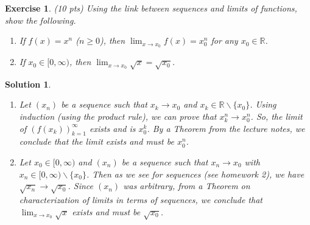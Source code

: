 \documentclass[12pt]{article}
\newcommand{\bR}{\mathbb{R}}
\newcommand{\ra}{\rightarrow}
\theoremstyle{plain}
\newtheorem{exer}{\textbf{Exercise}}}
\theoremstyle{plain}
\newtheorem*{sol}{\textbf{Solution}}}
\theoremstyle{plain}
\theoremstyle{plain}
\begin{document}
\begin{exer}
(10 pts)
Using the link between sequences and limits of functions, show the following.
	\begin{enumerate}[label=\textbf{\alph*)}]
	\item If $f(x) = x^n$ ($n \geq 0$), then $\lim_{x \ra x_0} f(x) = x_0^n$ for any $x_0 \in \bR$.
	\item If $x_0 \in [0, \infty )$, then $\lim_{x \ra x_0} \sqrt{x} = \sqrt{x_0}$.
\end{enumerate}	 
\end{exer}
\begin{sol}
\begin{enumerate}[label=\textbf{\alph*)}]
\item Let $(x_n)$ be a sequence such that $x_k \ra x_0$ and $x_k \in \bR \backslash \{ x_0 \}$. Using induction (using the product rule), we can prove that $x_k^n \ra x_0^n$. So, the limit of $(f(x_k))_{k = 1}^\infty$ exists and is $x_0^k$. By a Theorem from the lecture notes, we conclude that the limit exists and must be $x_0^n$.
\item Let $x_0 \in [0, \infty )$ and $(x_n)$ be a sequence such that $x_n \ra x_0$ with $x_n \in [0, \infty ) \backslash \{ x_0 \}$. Then as we see for sequences (see homework 2), we have $\sqrt{x_n} \ra \sqrt{x_0}$. Since $(x_n)$ was arbitrary, from a Theorem on characterization of limits in terms of sequences, we conclude that $\lim_{x \ra x_0} \sqrt{x}$ exists and must be $\sqrt{x_0}$.
\end{enumerate}
\end{sol}
\end{document}
